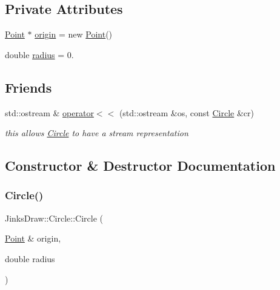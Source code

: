 \subsection*{Private Attributes}
\begin{DoxyCompactItemize}
\item 
\mbox{\hyperlink{class_jinks_draw_1_1_point}{Point}} $\ast$ \mbox{\hyperlink{class_jinks_draw_1_1_circle_a2214560f54448ce8c0bbb41dc956abe4}{origin}} = new \mbox{\hyperlink{class_jinks_draw_1_1_point}{Point}}()
\item 
double \mbox{\hyperlink{class_jinks_draw_1_1_circle_ad38af0c31ab4aa5d90aaf6cf83a60ab2}{radius}} = 0.
\end{DoxyCompactItemize}
\subsection*{Friends}
\begin{DoxyCompactItemize}
\item 
std\+::ostream \& \mbox{\hyperlink{class_jinks_draw_1_1_circle_acde181b779d97f3d80bc38d27e08c403}{operator$<$$<$}} (std\+::ostream \&os, const \mbox{\hyperlink{class_jinks_draw_1_1_circle}{Circle}} \&cr)
\begin{DoxyCompactList}\small\item\em this allows \mbox{\hyperlink{class_jinks_draw_1_1_circle}{Circle}} to have a stream representation \end{DoxyCompactList}\end{DoxyCompactItemize}


\subsection{Constructor \& Destructor Documentation}
\mbox{\label{class_jinks_draw_1_1_circle_a716c96c7f03a6ab5865f0da4dc9c4b52}} 
\subsubsection{\texorpdfstring{Circle()}{Circle()}}
{\footnotesize\ttfamily Jinks\+Draw\+::\+Circle\+::\+Circle (\begin{DoxyParamCaption}\item[{\mbox{\hyperlink{class_jinks_draw_1_1_point}{Point}} \&}]{origin,  }\item[{double}]{radius }\end{DoxyParamCaption})}



